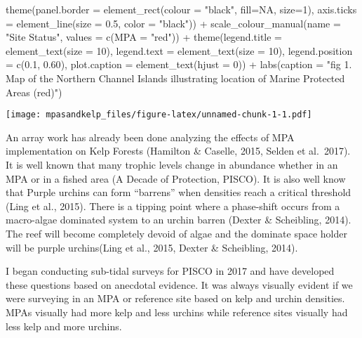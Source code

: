 \documentclass[
]{article}
\newenvironment{Shaded}{\begin{snugshade}}{\end{snugshade}}
\newcommand{\AttributeTok}[1]{\textcolor[rgb]{0.77,0.63,0.00}{#1}}
\newcommand{\ConstantTok}[1]{\textcolor[rgb]{0.00,0.00,0.00}{#1}}
\newcommand{\DecValTok}[1]{\textcolor[rgb]{0.00,0.00,0.81}{#1}}
\newcommand{\FloatTok}[1]{\textcolor[rgb]{0.00,0.00,0.81}{#1}}
\newcommand{\FunctionTok}[1]{\textcolor[rgb]{0.00,0.00,0.00}{#1}}
\newcommand{\NormalTok}[1]{#1}
\newcommand{\SpecialCharTok}[1]{\textcolor[rgb]{0.00,0.00,0.00}{#1}}
\newcommand{\StringTok}[1]{\textcolor[rgb]{0.31,0.60,0.02}{#1}}
\begin{document}
\begin{Shaded}
\begin{Highlighting}[]
  \FunctionTok{theme}\NormalTok{(}\AttributeTok{panel.border =} \FunctionTok{element\_rect}\NormalTok{(}\AttributeTok{colour =} \StringTok{"black"}\NormalTok{, }\AttributeTok{fill=}\ConstantTok{NA}\NormalTok{, }\AttributeTok{size=}\DecValTok{1}\NormalTok{),}
        \AttributeTok{axis.ticks =} \FunctionTok{element\_line}\NormalTok{(}\AttributeTok{size =} \FloatTok{0.5}\NormalTok{, }\AttributeTok{color =} \StringTok{"black"}\NormalTok{)) }\SpecialCharTok{+}
  \FunctionTok{scale\_colour\_manual}\NormalTok{(}\AttributeTok{name =} \StringTok{"Site Status"}\NormalTok{, }\AttributeTok{values =} \FunctionTok{c}\NormalTok{(}\AttributeTok{MPA =} \StringTok{"red"}\NormalTok{)) }\SpecialCharTok{+} 
  \FunctionTok{theme}\NormalTok{(}\AttributeTok{legend.title =} \FunctionTok{element\_text}\NormalTok{(}\AttributeTok{size =} \DecValTok{10}\NormalTok{), }
        \AttributeTok{legend.text =} \FunctionTok{element\_text}\NormalTok{(}\AttributeTok{size =} \DecValTok{10}\NormalTok{),}
        \AttributeTok{legend.position =} \FunctionTok{c}\NormalTok{(}\FloatTok{0.1}\NormalTok{, }\FloatTok{0.60}\NormalTok{),}
        \AttributeTok{plot.caption =} \FunctionTok{element\_text}\NormalTok{(}\AttributeTok{hjust =} \DecValTok{0}\NormalTok{)) }\SpecialCharTok{+}
  \FunctionTok{labs}\NormalTok{(}\AttributeTok{caption =} \StringTok{"fig 1. Map of the Northern Channel Islands illustrating location of Marine Protected Areas (red)"}\NormalTok{)}
\end{Highlighting}
\end{Shaded}

\texttt{[image: mpasandkelp\_files/figure-latex/unnamed-chunk-1-1.pdf]}

An array work has already been done analyzing the effects of MPA
implementation on Kelp Forests (Hamilton \& Caselle, 2015, Selden et
al.~2017). It is well known that many trophic levels change in abundance
whether in an MPA or in a fished area (A Decade of Protection, PISCO).
It is also well know that Purple urchins can form ``barrens'' when
densities reach a critical threshold (Ling et al., 2015). There is a
tipping point where a phase-shift occurs from a macro-algae dominated
system to an urchin barren (Dexter \& Scheibling, 2014). The reef will
become completely devoid of algae and the dominate space holder will be
purple urchins(Ling et al., 2015, Dexter \& Scheibling, 2014).

I began conducting sub-tidal surveys for PISCO in 2017 and have
developed these questions based on anecdotal evidence. It was always
visually evident if we were surveying in an MPA or reference site based
on kelp and urchin densities. MPAs visually had more kelp and less
urchins while reference sites visually had less kelp and more urchins.
\end{document}
